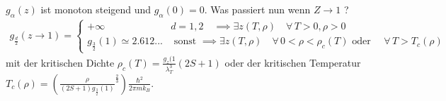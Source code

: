 $g_\alpha(z)$ ist monoton steigend und $g_\alpha(0) = 0$. Was passiert nun 
wenn $Z\to1$ ?
%
%
\begin{align*}
  g_{\frac{d}{2}} (z\to1) = \begin{cases}
    +\infty & d = 1,2 \quad \implies \exists z(T, \rho) \quad\forall\, T > 0, \rho > 0 \\
    g_{\frac{3}{2}}(1) \simeq 2.612... & \text{ sonst }\implies \exists z(T, \rho) \quad\forall\, 0 < \rho < \rho_c(T) \text{ oder }
    \quad\forall\, T > T_c(\rho)
  \end{cases} 
\end{align*}
%
mit der kritischen Dichte $\rho_c(T) = \frac{g_z(1}{\lambda_T^3} (2 S + 1)$ 
oder der kritischen Temperatur $T_c(\rho) = \left( \frac{\rho}{(2 S +1)
g_{\frac{3}{2}}(1)}^{\frac{2}{3}} \right) \frac{\hbar^2}{2 \pi m k_B}$.









